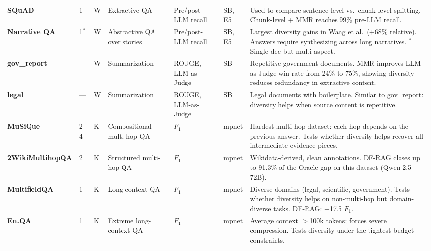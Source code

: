 \documentclass[11pt,a4paper]{article}
\begin{document}
\begin{small}
\begin{longtable}{@{}p{2.5cm}p{0.8cm}p{1.2cm}p{2.4cm}p{2.2cm}p{1.8cm}p{\dimexpr\textwidth-2.5cm-0.8cm-1.2cm-2.4cm-2.2cm-1.8cm-12\tabcolsep\relax}@{}}
		\addlinespace
		\textbf{SQuAD} & 1 & W & Extractive QA & Pre/post-LLM recall & SB, E5 & Used to compare sentence-level vs.\ chunk-level splitting. Chunk-level + MMR reaches 99\% pre-LLM recall. \\
		\addlinespace
		\textbf{Narrative QA} & 1$^*$ & W & Abstractive QA over stories & Pre/post-LLM recall & SB, E5 & Largest diversity gains in Wang et al.\ ($+68\%$ relative). Answers require synthesizing across long narratives. $^*$Single-doc but multi-aspect. \\
		\addlinespace
		\textbf{gov\_report} & --- & W & Summarization & ROUGE, LLM-as-Judge & SB & Repetitive government documents. MMR improves LLM-as-Judge win rate from 24\% to 75\%, showing diversity reduces redundancy in extractive content. \\
		\addlinespace
		\textbf{legal} & --- & W & Summarization & ROUGE, LLM-as-Judge & SB & Legal documents with boilerplate. Similar to gov\_report: diversity helps when source content is repetitive. \\
		\addlinespace
		\textbf{MuSiQue} & 2--4 & K & Compositional multi-hop QA & $F_1$ & mpnet & Hardest multi-hop dataset: each hop depends on the previous answer. Tests whether diversity helps recover all intermediate evidence pieces. \\
		\addlinespace
		\textbf{2Wiki\newline MultihopQA} & 2 & K & Structured multi-hop QA & $F_1$ & mpnet & Wikidata-derived, clean annotations. DF-RAG closes up to 91.3\% of the Oracle gap on this dataset (Qwen 2.5 72B). \\
		\addlinespace
		\textbf{MultifieldQA} & 1 & K & Long-context QA & $F_1$ & mpnet & Diverse domains (legal, scientific, government). Tests whether diversity helps on non-multi-hop but domain-diverse tasks. DF-RAG: +17.5 $F_1$. \\
		\addlinespace
		\textbf{En.QA} & 1 & K & Extreme long-context QA & $F_1$ & mpnet & Average context $>$100k tokens; forces severe compression. Tests diversity under the tightest budget constraints. \\
	\end{longtable}
\end{small}
\end{document}
